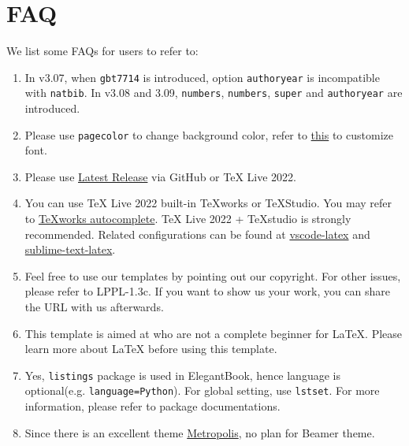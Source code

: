 \documentclass[11pt]{elegantbook}
\begin{document}
\chapter{FAQ}
We list some FAQs for users to refer to:
\begin{enumerate}
  \item {}
  In v3.07, when \lstinline{gbt7714} is introduced, option \lstinline{authoryear} is incompatible with \lstinline{natbib}. In v3.08 and 3.09, \lstinline{numbers}, \lstinline{numbers}, \lstinline{super} and \lstinline{authoryear} are introduced.
  \item {}
  Please use \lstinline{pagecolor} to change background color, refer to \href{https://tex.stackexchange.com/questions/278544/xcolor-what-is-the-equivalent-of-default-text-color}{this} to customize font.
  \item {}
  Please use \href{https://github.com/ElegantLaTeX/ElegantBook/releases}{Latest Release} via GitHub or \TeX{} Live 2022.
  \item {}
  You can use \TeX{} Live 2022 built-in \TeX works or \TeX Studio. You may refer to \href{https://github.com/EthanDeng/texworks-autocomplete}{\TeX{}works autocomplete}. \TeX{} Live 2022 + \TeX{}studio is strongly recommended. Related configurations can be found at \href{https://github.com/EthanDeng/vscode-latex}{vscode-latex} and \href{https://github.com/EthanDeng/sublime-text-latex}{sublime-text-latex}.
  \item {}
  Feel free to use our templates by pointing out our copyright. For other issues, please refer to LPPL-1.3c. If you want to show us your work, you can share the URL with us afterwards.
  \item {}
  This template is aimed at who are not a complete beginner for \LaTeX{}. Please learn more about \LaTeX{} before using this template.
  \item {}
  Yes, \lstinline{listings} package is used in ElegantBook, hence language is optional(e.g. \lstinline{language=Python}). For global setting, use \lstinline{lstset}. For more information, please refer to package documentations.
  \item {}
  Since there is an excellent theme \href{https://github.com/matze/mtheme}{Metropolis}, no plan for Beamer theme.
\end{enumerate}
\end{document}
